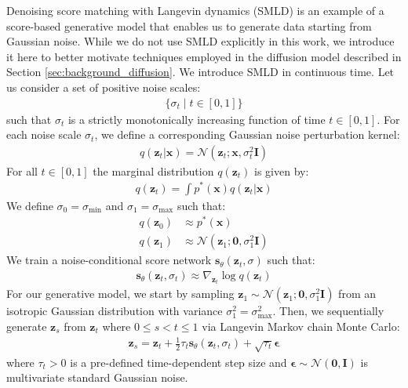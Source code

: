 \documentclass[ oneside,%
                    author={George Herbert},
                    degree={MSci},
                     title={Video Diffusion Models for Climate Simulations},
                  subtitle={}]{dissertation}
\begin{document}
Denoising score matching with Langevin dynamics (SMLD) \cite{Generative_Modelling_By_Estimating_Gradients_Song} is an example of a score-based generative model that enables us to generate data starting from Gaussian noise. While we do not use SMLD explicitly in this work, we introduce it here to better motivate techniques employed in the diffusion model described in Section \ref{sec:background_diffusion}. We introduce SMLD in continuous time. Let us consider a set of positive noise scales:
\begin{align}
      \{ \sigma_t \mid t\in[0,1] \}
\end{align}
such that $\sigma_t$ is a strictly monotonically increasing function of time $t\in[0,1]$. For each noise scale $\sigma_t$, we define a corresponding Gaussian noise perturbation kernel:
\begin{align}
      q(\mathbf{z}_t|\mathbf{x})=\mathcal{N}\left(\mathbf{z}_t; \mathbf{x}, \sigma_t^2\mathbf{I}\right)
\end{align}
For all $t\in[0,1]$ the marginal distribution $q(\mathbf{z}_t)$ is given by:
\begin{align}
      q(\mathbf{z}_t)=\int p^*(\mathbf{x})q(\mathbf{z}_t|\mathbf{x})
\end{align}
We define $\sigma_0 = \sigma_{\min}$ and $\sigma_1 = \sigma_{\max}$ such that:
\begin{align}
      q(\mathbf{z}_0)&\approx p^*(\mathbf{x})\\
      q(\mathbf{z}_1)&\approx\mathcal{N}(\mathbf{z}_1;\mathbf{0}, \sigma_{1}^2\mathbf{I})
\end{align}
We train a noise-conditional score network $\mathbf{s}_\theta(\mathbf{z}_t, \sigma)$ such that:
\begin{align}
      \mathbf{s}_\theta(\mathbf{z}_t, \sigma_t)\approx \nabla_{\mathbf{z}_t} \log q(\mathbf{z}_t)
\end{align}
For our generative model, we start by sampling $\mathbf{z}_1\sim \mathcal{N}(\mathbf{z}_1; \mathbf{0}, \sigma_{1}^2\mathbf{I})$ from an isotropic Gaussian distribution with variance $\sigma_1^2=\sigma_{\max}^2$. Then, we sequentially generate $\mathbf{z}_s$ from $\mathbf{z}_t$ where $0\le s < t \le 1$ via Langevin Markov chain Monte Carlo:
\begin{align}
      \mathbf{z}_s = \mathbf{z}_t + \frac{1}{2}\tau_t \mathbf{s}_\theta(\mathbf{z}_t, \sigma_t)+\sqrt{\tau_t}\boldsymbol\epsilon
\end{align}
where $\tau_t>0$ is a pre-defined time-dependent step size and $\boldsymbol\epsilon\sim\mathcal{N}(\mathbf{0}, \mathbf{I})$ is multivariate standard Gaussian noise.
\end{document}
